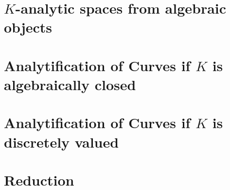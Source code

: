 \section{$K$-analytic spaces from algebraic objects} \label{sec:berkovich_analytification_of_schemes}



\section{Analytification of Curves if $K$ is algebraically closed} \label{sec:analytification_of_curves}



\section{Analytification of Curves if $K$ is discretely valued} \label{sec:analytification_of_curves_discretely_valued}

\section{Reduction} \label{sec:reduction}



\section{} \label{sec:}

